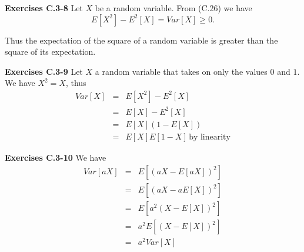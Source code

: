 \documentclass[a4paper,12pt]{article}
\newcommand{\newpar}[1]
{\bigskip \noindent \textbf{Exercises #1} \newline}
\begin{document}
\newpar{C.3-8}
Let $X$ be a random variable.  From (C.26) we have
\[ E[X^2] - E^2[X] = Var[X] \ge 0.\]

Thus the expectation of the square of a random variable is greater
than the square of its expectation.

\newpar{C.3-9}
Let $X$ a random variable that takes on only the values $0$ and $1$.
We have $X^2 = X$, thus
\begin{eqnarray*}
  Var[X] &=& E[X^2] - E^2[X] \\
  &=& E[X] - E^2[X] \\
  &=& E[X](1 - E[X]) \\
  &=& E[X] E[1-X]\,\mbox{by linearity}
\end{eqnarray*}

\newpar{C.3-10}
We have
\begin{eqnarray*}
  Var[a X] &=& E[(aX - E[aX])^2] \\
  &=& E[(aX - aE[X])^2] \\
  &=& E[a^2(X-E[X])^2] \\
  &=& a^2 E[(X-E[X])^2] \\
  &=& a^2 Var[X]
\end{eqnarray*}
\end{document}
